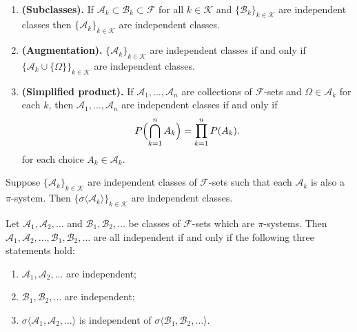 \begin{theorem}{$\phantom{asfd}$}
\begin{enumerate}
\item {\bf (Subclasses).} If $\mathscr A_k\subset \mathscr B_k\subset \mathcal F$ for all $k\in\mathcal K$ and $\{\mathscr B_k\}_{k\in\mathcal K}$ are independent classes then  $\{\mathscr A_k\}_{k\in\mathcal K}$ are independent classes.
\item   {\bf (Augmentation).} $\bigl\{\mathscr A_k\bigr\}_{k\in\mathcal K}$ are independent classes if and only if  $\bigl\{\mathscr A_k\cup \{ \Omega \}\bigr\}_{k\in\mathcal K}$ are independent classes.
\item  {\bf (Simplified product). } If $\mathscr A_1,\ldots, \mathscr A_n$ are collections of $\mathcal F$-sets and $\Omega\in\mathscr A_k$ for each $k$, then $\mathscr A_1,\ldots, \mathscr A_n$ are independent classes if and only if
\[ P\Bigl(\bigcap_{k=1}^nA_k\Bigr) = \prod_{k=1}^n P(A_k).\]
for each choice $A_k\in\mathscr A_k$.
\end{enumerate}
\end{theorem}

\begin{theorem}
Suppose $\{\mathscr A_k\}_{k\in\mathcal K}$ are independent classes of  $\mathcal F$-sets such that each $\mathscr A_k$ is also a $\pi$-system. Then $\{\sigma\langle \mathscr A_k\rangle \}_{k\in\mathcal K}$ are independent classes.
\end{theorem}

\begin{theorem}[{\bf ANOVA}] Let $\mathscr A_1, \mathscr A_2,\ldots$ and $\mathscr B_1, \mathscr B_2,\ldots$ be classes of $\mathcal F$-sets which are $\pi$-systems. Then $\mathscr A_1, \mathscr A_2,\ldots,\mathscr B_1, \mathscr B_2,\ldots$ are all independent  if and only if the following three statements hold:
\begin{enumerate}
\item $\mathscr A_1, \mathscr A_2,\ldots$ are independent;
\item $\mathscr B_1, \mathscr B_2,\ldots$ are independent;
\item $\sigma\langle \mathscr A_1, \mathscr A_2,\ldots \rangle $ is independent of  $\sigma\langle \mathscr
B_1, \mathscr B_2,\ldots \rangle $.
\end{enumerate}
\end{theorem}


